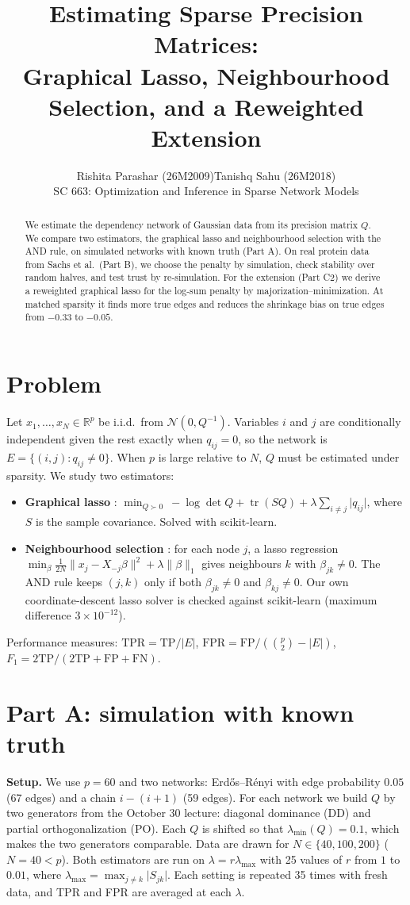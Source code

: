 \documentclass[10pt]{article}
\title{Estimating Sparse Precision Matrices:\\Graphical Lasso, Neighbourhood Selection, and a Reweighted Extension}
\author{Rishita Parashar (26M2009)\qquad Tanishq Sahu (26M2018)\\[2pt]
SC 663: Optimization and Inference in Sparse Network Models}
\date{}
\newcommand{\R}{\mathbb{R}}
\newcommand{\abs}[1]{\lvert #1 \rvert}
\begin{document}
\maketitle

\begin{abstract}
We estimate the dependency network of Gaussian data from its precision matrix $Q$. We compare two estimators, the graphical lasso and neighbourhood selection with the AND rule, on simulated networks with known truth (Part A). On real protein data from Sachs et al.\ (Part B), we choose the penalty by simulation, check stability over random halves, and test trust by re-simulation. For the extension (Part C2) we derive a reweighted graphical lasso for the log-sum penalty by majorization--minimization. At matched sparsity it finds more true edges and reduces the shrinkage bias on true edges from $-0.33$ to $-0.05$.
\end{abstract}

\section{Problem}
Let $x_1,\dots,x_N\in\R^p$ be i.i.d.\ from $\mathcal N(0,Q^{-1})$. Variables $i$ and $j$ are conditionally independent given the rest exactly when $q_{ij}=0$, so the network is $E=\{(i,j): q_{ij}\neq 0\}$. When $p$ is large relative to $N$, $Q$ must be estimated under sparsity. We study two estimators:
\begin{itemize}
\item \textbf{Graphical lasso} \cite{friedman2008}: $\min_{Q\succ 0}\ -\log\det Q+\operatorname{tr}(SQ)+\lambda\sum_{i\neq j}\abs{q_{ij}}$, where $S$ is the sample covariance. Solved with scikit-learn.
\item \textbf{Neighbourhood selection} \cite{meinshausen2006}: for each node $j$, a lasso regression $\min_\beta \frac{1}{2N}\|x_j-X_{-j}\beta\|^2+\lambda\|\beta\|_1$ gives neighbours $k$ with $\beta_{jk}\neq 0$. The AND rule keeps $(j,k)$ only if both $\beta_{jk}\neq 0$ and $\beta_{kj}\neq 0$. Our own coordinate-descent lasso solver is checked against scikit-learn (maximum difference $3\times10^{-12}$).
\end{itemize}
Performance measures: $\mathrm{TPR}=\mathrm{TP}/\abs{E}$, $\mathrm{FPR}=\mathrm{FP}/(\binom{p}{2}-\abs{E})$, $F_1=2\mathrm{TP}/(2\mathrm{TP}+\mathrm{FP}+\mathrm{FN})$.

\section{Part A: simulation with known truth}
\textbf{Setup.} We use $p=60$ and two networks: Erd\H{o}s--R\'enyi with edge probability $0.05$ (67 edges) and a chain $i\!-\!(i{+}1)$ (59 edges). For each network we build $Q$ by two generators from the October 30 lecture: diagonal dominance (DD) and partial orthogonalization (PO). Each $Q$ is shifted so that $\lambda_{\min}(Q)=0.1$, which makes the two generators comparable. Data are drawn for $N\in\{40,100,200\}$ ($N=40<p$). Both estimators are run on $\lambda=r\lambda_{\max}$ with 25 values of $r$ from $1$ to $0.01$, where $\lambda_{\max}=\max_{j\neq k}\abs{S_{jk}}$. Each setting is repeated 35 times with fresh data, and TPR and FPR are averaged at each $\lambda$.
\end{document}
